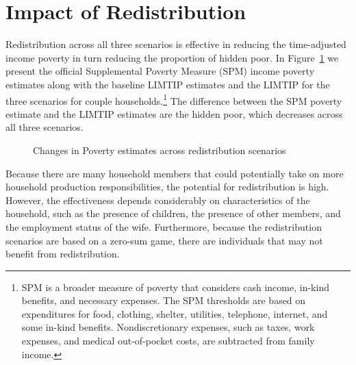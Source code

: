 \documentclass[
  11pt,
]{article}
\begin{document}
\section{Impact of Redistribution}\label{impact-of-redistribution}

Redistribution across all three scenarios is effective in reducing the
time-adjusted income poverty in turn reducing the proportion of hidden
poor. In Figure~\ref{fig-limtip} we present the official Supplemental
Poverty Measure (SPM) income poverty estimates along with the baseline
LIMTIP estimates and the LIMTIP for the three scenarios for couple
households.\footnote{SPM is a broader measure of poverty that considers
  cash income, in-kind benefits, and necessary expenses. The SPM
  thresholds are based on expenditures for food, clothing, shelter,
  utilities, telephone, internet, and some in-kind benefits.
  Nondiscretionary expenses, such as taxes, work expenses, and medical
  out-of-pocket costs, are subtracted from family income.} The
difference between the SPM poverty estimate and the LIMTIP estimates are
the hidden poor, which decreases across all three scenarios.

\begin{figure}[H]


\caption{\label{fig-limtip}Changes in Poverty estimates across
redistribution scenarios}

\end{figure}%

Because there are many household members that could potentially take on
more household production responsibilities, the potential for
redistribution is high. However, the effectiveness depends considerably
on characteristics of the household, such as the presence of children,
the presence of other members, and the employment status of the wife.
Furthermore, because the redistribution scenarios are based on a
zero-sum game, there are individuals that may not benefit from
redistribution.
\end{document}
